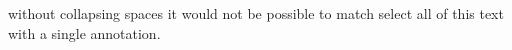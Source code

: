 \documentclass{amsart}
\begin{document}
without
collapsing
spaces
it
would
not
be
possible
to
match
select
all
of
this
text
                with    a
single          annotation.
\end{document}
